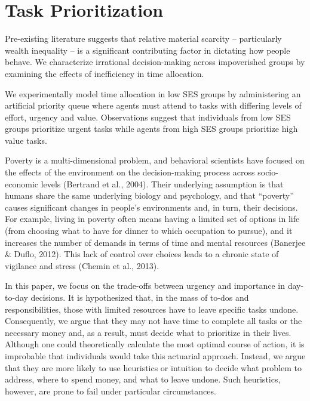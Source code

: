 \hypertarget{task-prioritization}{%
\section{Task Prioritization}\label{task-prioritization}}

\begin{tcolorbox}[enhanced jigsaw, toptitle=1mm, coltitle=black, colframe=quarto-callout-important-color-frame, colbacktitle=quarto-callout-important-color!10!white, titlerule=0mm, opacityback=0, rightrule=.15mm, bottomtitle=1mm, title={§Abstract}, bottomrule=.15mm, breakable, left=2mm, arc=.35mm, toprule=.15mm, leftrule=.75mm, colback=white, opacitybacktitle=0.6]

Pre-existing literature suggests that relative material scarcity --
particularly wealth inequality -- is a significant contributing factor
in dictating how people behave. We characterize irrational
decision-making across impoverished groups by examining the effects of
inefficiency in time allocation.

We experimentally model time allocation in low SES groups by
administering an artificial priority queue where agents must attend to
tasks with differing levels of effort, urgency and value. Observations
suggest that individuals from low SES groups prioritize urgent tasks
while agents from high SES groups prioritize high value tasks.

\end{tcolorbox}

Poverty is a multi-dimensional problem, and behavioral scientists have
focused on the effects of the environment on the decision-making process
across socio-economic levels (Bertrand et al., 2004). Their underlying
assumption is that humans share the same underlying biology and
psychology, and that ``poverty'' causes significant changes in people's
environments and, in turn, their decisions. For example, living in
poverty often means having a limited set of options in life (from
choosing what to have for dinner to which occupation to pursue), and it
increases the number of demands in terms of time and mental resources
(Banerjee \& Duflo, 2012). This lack of control over choices leads to a
chronic state of vigilance and stress (Chemin et al., 2013).

In this paper, we focus on the trade-offs between urgency and importance
in day-to-day decisions. It is hypothesized that, in the mass of to-dos
and responsibilities, those with limited resources have to leave
specific tasks undone. Consequently, we argue that they may not have
time to complete all tasks or the necessary money and, as a result, must
decide what to prioritize in their lives. Although one could
theoretically calculate the most optimal course of action, it is
improbable that individuals would take this actuarial approach. Instead,
we argue that they are more likely to use heuristics or intuition to
decide what problem to address, where to spend money, and what to leave
undone. Such heuristics, however, are prone to fail under particular
circumstances.

